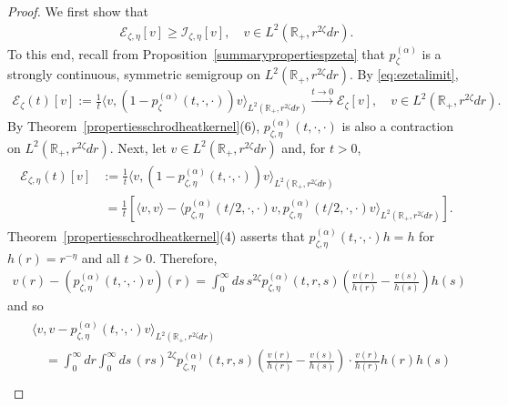 \documentclass[12pt,reqno]{amsart}
\theoremstyle{definition}
\theoremstyle{remark}
\numberwithin{equation}{section}
\newcommand{\1}{\mathbbm{1}}
\newcommand{\R}{\mathbb{R}}
\def\ce{\mathcal{E}}
\def\ci{\mathcal{I}}
\newcommand{\one}{\mathbf{1}}
\begin{document}
\begin{proof}
  We first show that 
    \begin{align}\label{e.cEI}
    \ce_{\zeta,\eta}[v] \geq \ci_{\zeta,\eta}[v], \quad v\in L^2(\R_+,r^{2\zeta}dr).
  \end{align}
  To this end, recall from Proposition~\ref{summarypropertiespzeta} that $p_\zeta^{(\alpha)}$ is a strongly continuous, symmetric semigroup on $L^2(\R_+,r^{2\zeta}dr)$. By \eqref{eq:ezetalimit},
  \begin{align}
    \ce_{\zeta}(t)[v]
    := \frac1t\langle v,(1-p_\zeta^{(\alpha)}(t,\cdot,\cdot))v\rangle_{L^2(\R_+,r^{2\zeta}dr)}
    \stackrel{t\to0}{\longrightarrow} \ce_\zeta[v], \quad v\in L^2(\R_+,r^{2\zeta}dr).
  \end{align}
  By Theorem~\ref{propertiesschrodheatkernel}(6), $p_{\zeta,\eta}^{(\alpha)}(t,\cdot,\cdot)$ is also a contraction on $L^2(\R_+,r^{2\zeta}dr)$. Next, let $v\in L^2(\R_+,r^{2\zeta}dr)$ and, for $t>0$,
  \begin{align}
    \begin{split}
      \ce_{\zeta,\eta}(t)[v]
      & := \frac1t\langle v,(1-p_{\zeta,\eta}^{(\alpha)}(t,\cdot,\cdot))v\rangle_{L^2(\R_+,r^{2\zeta}dr)} \\
      & \ = \frac1t\left[\langle v,v\rangle - \langle p_{\zeta,\eta}^{(\alpha)}(t/2,\cdot,\cdot)v, p_{\zeta,\eta}^{(\alpha)}(t/2,\cdot,\cdot)v\rangle_{L^2(\R_+,r^{2\zeta}dr)}\right].
    \end{split}
  \end{align}
  Theorem~\ref{propertiesschrodheatkernel}(4) asserts that $p_{\zeta,\eta}^{(\alpha)}(t,\cdot,\cdot)h=h$ for $h(r)=r^{-\eta}$ and all $t>0$. Therefore,
  \begin{align}
    v(r) - (p_{\zeta,\eta}^{(\alpha)}(t,\cdot,\cdot)v)(r)
    = \int_0^\infty ds\, s^{2\zeta} p_{\zeta,\eta}^{(\alpha)}(t,r,s)\left(\frac{v(r)}{h(r)}-\frac{v(s)}{h(s)}\right)h(s)
  \end{align}
  and so
  \begin{align}
    \begin{split}
      & \langle v,v- p_{\zeta,\eta}^{(\alpha)}(t,\cdot,\cdot)v\rangle_{L^2(\R_+,r^{2\zeta}dr)} \\
      & \quad = \int_0^\infty dr\int_0^\infty ds\, (rs)^{2\zeta} p_{\zeta,\eta}^{(\alpha)}(t,r,s)\left(\frac{v(r)}{h(r)}-\frac{v(s)}{h(s)}\right) \cdot \frac{v(r)}{h(r)}h(r)h(s) \\

\end{split}
\end{align}
\end{proof}
\end{document}
